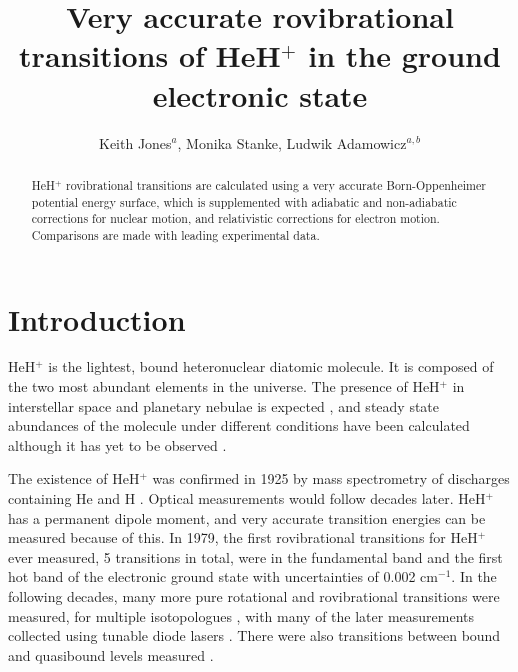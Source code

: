 \documentclass[aps,onecolumn]{revtex4}
\begin{document}
\title{Very accurate rovibrational transitions of
HeH$^+$ in the ground electronic state}
\author{
Keith Jones$^{a}$, Monika Stanke,
Ludwik Adamowicz$^{a,b}$}

\begin{abstract}
HeH$^+$ rovibrational transitions are calculated using a very accurate Born-Oppenheimer
potential energy surface, which is supplemented with adiabatic and non-adiabatic corrections
for nuclear motion, and relativistic corrections for electron motion. Comparisons are made
with leading experimental data.
\end{abstract}

\maketitle

\section{Introduction}
\label{Introduction}
HeH$^+$ is the lightest, bound heteronuclear diatomic molecule. It is composed of the
two most abundant elements in the universe. The presence of HeH$^+$ in interstellar space and
planetary nebulae is expected \cite{Astro3, Astro4, Astro5}, and steady state abundances
of the molecule under different conditions have been calculated \cite{Astro1_SS_HeH+} although
it has yet to be observed \cite{Astro2, PES5}.

The existence of HeH$^+$ was confirmed in 1925 by mass spectrometry of discharges
containing He and H \cite{exp3}. Optical measurements would follow decades later.
HeH$^+$ has a permanent dipole moment, and very
accurate transition energies can be measured because of this. In 1979, the first rovibrational
transitions for HeH$^+$  ever measured, 5 transitions in total, were in the fundamental
band and the first hot band of the electronic ground state \cite{exp2} with uncertainties
of 0.002 cm$^{-1}$. In the following decades, many more pure rotational \cite{exp1, exp7, exp9}
and rovibrational \cite{exp4, exp5, exp6, exp8, exp9, exp10} transitions were measured, for
multiple isotopologues \cite{exp1, exp4, exp10}, with many of the later measurements collected
using tunable diode lasers \cite{exp7, exp8, exp10}. There were also transitions between bound
and quasibound levels measured \cite{exp5}.
\end{document}
